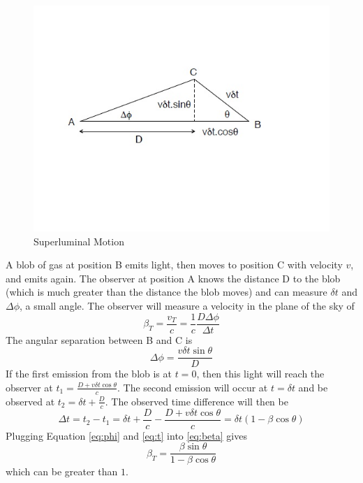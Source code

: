 \begin{figure}[!h]
\begin{center}
\includegraphics[width=\textwidth]{slum.jpg}
\end{center}
\caption{Superluminal Motion
\label{fig:slum}}
\end{figure}

A blob of gas at position B emits light, then moves to position C with 
velocity $v$, and emits again.  The observer at position A knows the distance 
D to the blob (which is much greater than the distance the blob moves) and 
can measure $\delta t$ and $\Delta\phi$, a small angle.  The observer will 
measure a velocity in the plane of the sky of 
\begin{equation}\label{eq:beta}
\beta_T=\frac{v_T}{c}=\frac{1}{c}\frac{D\Delta\phi}{\Delta t}
\end{equation}
The angular separation between B and C is 
\begin{equation}\label{eq:phi}
\Delta\phi=\frac{v\delta t\sin\theta}{D}
\end{equation}
If the first emission from the blob is at $t=0$, then this light will 
reach the observer at $t_1=\frac{D+v\delta t\cos\theta}{c}$.  The second 
emission will occur at $t=\delta t$ and be observed at 
$t_2=\delta t+\frac{D}{c}$.  The observed time difference will then be
\begin{equation}\label{eq:t}
\Delta t=t_2-t_1=\delta t+\frac{D}{c}-\frac{D+v\delta t\cos\theta}{c}
=\delta t(1-\beta\cos\theta)
\end{equation}
Plugging Equation \ref{eq:phi} and \ref{eq:t} into \ref{eq:beta} gives 
\begin{equation}
\beta_T=\frac{\beta\sin\theta}{1-\beta\cos\theta}
\end{equation}
which can be greater than $1$.

